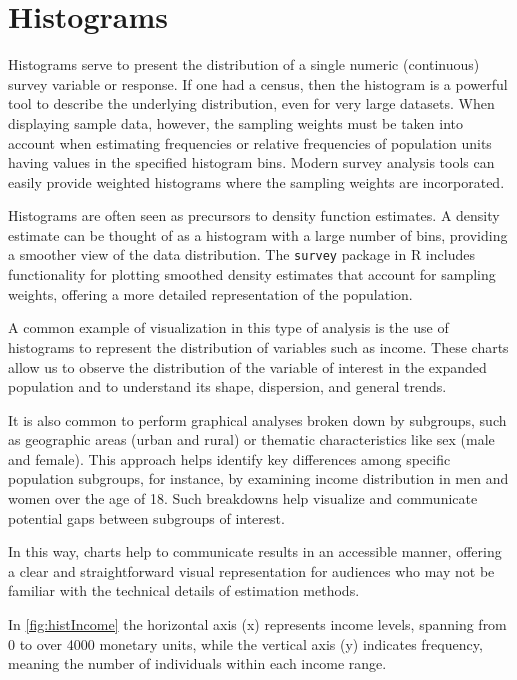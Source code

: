 \documentclass[
  12pt,
]{book}
\begin{document}
\hypertarget{histograms}{%
\section{Histograms}\label{histograms}}

Histograms serve to present the distribution of a single numeric (continuous) survey variable or response. If one had a census, then the histogram is a powerful tool to describe the underlying distribution, even for very large datasets. When displaying sample data, however, the sampling weights must be taken into account when estimating frequencies or relative frequencies of population units having values in the specified histogram bins. Modern survey analysis tools can easily provide weighted histograms where the sampling weights are incorporated.

Histograms are often seen as precursors to density function estimates. A density estimate can be thought of as a histogram with a large number of bins, providing a smoother view of the data distribution. The \texttt{survey} package in R includes functionality for plotting smoothed density estimates that account for sampling weights, offering a more detailed representation of the population.

A common example of visualization in this type of analysis is the use of histograms to represent the distribution of variables such as income. These charts allow us to observe the distribution of the variable of interest in the expanded population and to understand its shape, dispersion, and general trends.

It is also common to perform graphical analyses broken down by subgroups, such as geographic areas (urban and rural) or thematic characteristics like sex (male and female). This approach helps identify key differences among specific population subgroups, for instance, by examining income distribution in men and women over the age of 18. Such breakdowns help visualize and communicate potential gaps between subgroups of interest.

In this way, charts help to communicate results in an accessible manner, offering a clear and straightforward visual representation for audiences who may not be familiar with the technical details of estimation methods.

In \ref{fig:histIncome} the horizontal axis (x) represents income levels, spanning from 0 to over 4000 monetary units, while the vertical axis (y) indicates frequency, meaning the number of individuals within each income range.
\end{document}
